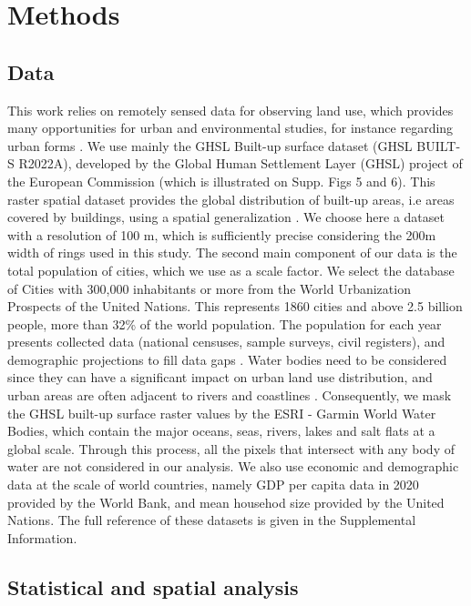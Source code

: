\documentclass[sn-mathphys-num]{sn-jnl}%
\theoremstyle{thmstyleone}%
\theoremstyle{thmstyletwo}%
\theoremstyle{thmstylethree}%
\begin{document}
\section*{Methods}%

\subsection*{Data}

This work relies on remotely sensed data for observing land use, which provides many opportunities for urban and environmental studies, for instance regarding urban forms \cite{zhu2019}. We use mainly the GHSL Built-up surface dataset (GHSL BUILT-S R2022A), developed by the Global Human Settlement Layer (GHSL) project of the European Commission (which is illustrated on Supp. Figs 5 and 6). This raster spatial dataset provides the global distribution of built-up areas, i.e areas covered by buildings, using a spatial generalization \cite{GHSL2020}. We choose here a dataset with a resolution of 100 m, which is sufficiently precise considering the 200m width of rings used in this study. 
The second main component of our data is the total population of cities, which we use as a scale factor. We select the database of Cities with 300,000 inhabitants or more %
from the World Urbanization Prospects of the United Nations. This represents 1860 cities and above 2.5 billion people, more than 32\% of the world population. The population for each year presents collected data (national censuses, sample surveys, civil registers), and demographic projections to fill data gaps \cite{UNWUP2018}.
Water bodies need to be considered since they can have a significant impact on urban land use distribution, and urban areas are often adjacent to rivers and coastlines \cite{grimm2008}. Consequently, we mask the GHSL built-up surface raster values by the ESRI - Garmin World Water Bodies, which contain the major oceans, seas, rivers, lakes and salt flats at a global scale. Through this process, all the pixels that intersect with any body of water are not considered in our analysis.
We also use economic and demographic data at the scale of world countries, namely GDP per capita data in 2020 provided by the World Bank, and mean househod size provided by the United Nations. The full reference of these datasets is given in the Supplemental Information.

\subsection*{Statistical and spatial analysis}
\end{document}
